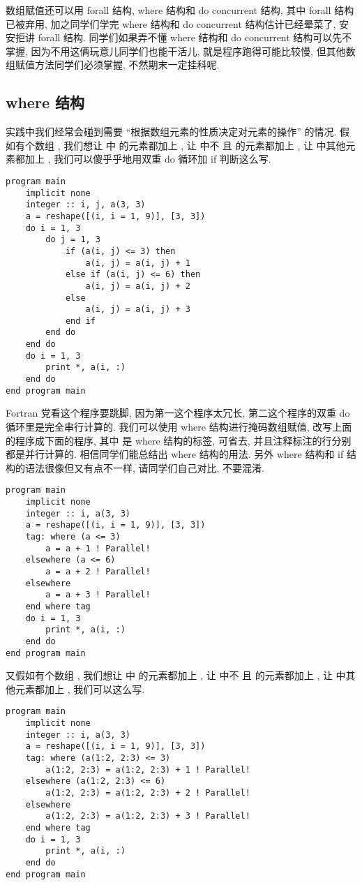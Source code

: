 数组赋值还可以用 forall 结构, where 结构和 do concurrent 结构, 其中 forall 结构已被弃用, 加之同学们学完 where 结构和 do concurrent 结构估计已经晕菜了, 安安拒讲 forall 结构. 同学们如果弄不懂 where 结构和 do concurrent 结构可以先不掌握, 因为不用这俩玩意儿同学们也能干活儿, 就是程序跑得可能比较慢, 但其他数组赋值方法同学们必须掌握, 不然期末一定挂科呢.

\subsection{where 结构}\label{where_construct}

实践中我们经常会碰到需要 ``根据数组元素的性质决定对元素的操作'' 的情况. 假如有个数组 , 我们想让  中  的元素都加上 , 让  中不  且  的元素都加上 , 让  中其他元素都加上 , 我们可以傻乎乎地用双重 do 循环加 if 判断这么写.
\begin{lstlisting}
program main
    implicit none
    integer :: i, j, a(3, 3)
    a = reshape([(i, i = 1, 9)], [3, 3])
    do i = 1, 3
        do j = 1, 3
            if (a(i, j) <= 3) then
                a(i, j) = a(i, j) + 1
            else if (a(i, j) <= 6) then
                a(i, j) = a(i, j) + 2
            else
                a(i, j) = a(i, j) + 3
            end if
        end do
    end do
    do i = 1, 3
        print *, a(i, :)
    end do
end program main
\end{lstlisting}
Fortran 党看这个程序要跳脚, 因为第一这个程序太冗长, 第二这个程序的双重 do 循环里是完全串行计算的. 我们可以使用 where 结构进行掩码数组赋值, 改写上面的程序成下面的程序, 其中  是 where 结构的标签, 可省去, 并且注释标注的行分别都是并行计算的. 相信同学们能总结出 where 结构的用法. 另外 where 结构和 if 结构的语法很像但又有点不一样, 请同学们自己对比, 不要混淆.
\begin{lstlisting}
program main
    implicit none
    integer :: i, a(3, 3)
    a = reshape([(i, i = 1, 9)], [3, 3])
    tag: where (a <= 3)
        a = a + 1 ! Parallel!
    elsewhere (a <= 6)
        a = a + 2 ! Parallel!
    elsewhere
        a = a + 3 ! Parallel!
    end where tag
    do i = 1, 3
        print *, a(i, :)
    end do
end program main
\end{lstlisting}
又假如有个数组 , 我们想让  中  的元素都加上 , 让  中不  且  的元素都加上 , 让  中其他元素都加上 , 我们可以这么写.
\begin{lstlisting}
program main
    implicit none
    integer :: i, a(3, 3)
    a = reshape([(i, i = 1, 9)], [3, 3])
    tag: where (a(1:2, 2:3) <= 3)
        a(1:2, 2:3) = a(1:2, 2:3) + 1 ! Parallel!
    elsewhere (a(1:2, 2:3) <= 6)
        a(1:2, 2:3) = a(1:2, 2:3) + 2 ! Parallel!
    elsewhere
        a(1:2, 2:3) = a(1:2, 2:3) + 3 ! Parallel!
    end where tag
    do i = 1, 3
        print *, a(i, :)
    end do
end program main
\end{lstlisting}

